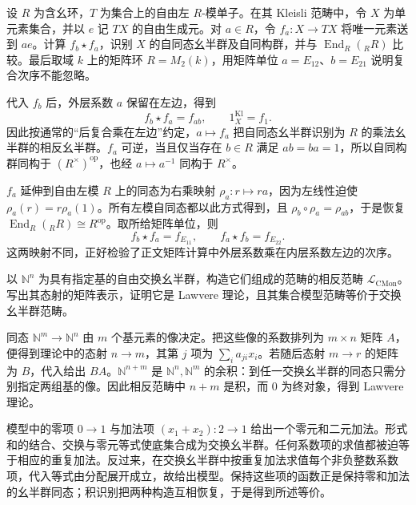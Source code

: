 \begin{exercise}\label{b4:ex:A-kleisli-module-matrices}
	设 \(R\) 为含幺环，\(T\) 为集合上的自由左 \(R\)-模单子。在其 Kleisli 范畴中，令 \(X\) 为单元素集合，并以 \(e\) 记 \(TX\) 的自由生成元。对 \(a\in R\)，令 \(f_a:X\to TX\) 将唯一元素送到 \(ae\)。计算 \(f_b\star f_a\)，识别 \(X\) 的自同态幺半群及自同构群，并与 \(\operatorname{End}_R({}_RR)\) 比较。最后取域 \(k\) 上的矩阵环 \(R=M_2(k)\)，用矩阵单位 \(a=E_{12}\)、\(b=E_{21}\) 说明复合次序不能忽略。
\end{exercise}
\begin{solution}
	代入 \(f_b\) 后，外层系数 \(a\) 保留在左边，得到
	\[
		f_b\star f_a=f_{ab},\qquad 1_X^{\mathrm{Kl}}=f_1.
	\]
	因此按通常的“后复合乘在左边”约定，\(a\mapsto f_a\) 把自同态幺半群识别为 \(R\) 的乘法幺半群的相反幺半群。\(f_a\) 可逆，当且仅当存在 \(b\in R\) 满足 \(ab=ba=1\)，所以自同构群同构于 \((R^\times)^{\mathrm{op}}\)，也经 \(a\mapsto a^{-1}\) 同构于 \(R^\times\)。

	\(f_a\) 延伸到自由左模 \(R\) 上的同态为右乘映射 \(\rho_a:r\mapsto ra\)，因为左线性迫使 \(\rho_a(r)=r\rho_a(1)\)。所有左模自同态都以此方式得到，且 \(\rho_b\circ\rho_a=\rho_{ab}\)，于是恢复 \(\operatorname{End}_R({}_RR)\cong R^{\mathrm{op}}\)。取所给矩阵单位，则
	\[
		f_b\star f_a=f_{E_{11}},\qquad f_a\star f_b=f_{E_{22}}.
	\]
	这两映射不同，正好检验了正文矩阵计算中外层系数乘在内层系数左边的次序。
\end{solution}

\begin{exercise}\label{b4:ex:A-lawvere-commutative-monoids}
	以 \(\mathbb N^n\) 为具有指定基的自由交换幺半群，构造它们组成的范畴的相反范畴 \(\mathcal L_{\mathrm{CMon}}\)。写出其态射的矩阵表示，证明它是 Lawvere 理论，且其集合模型范畴等价于交换幺半群范畴。
\end{exercise}
\begin{solution}
	同态 \(\mathbb N^m\to\mathbb N^n\) 由 \(m\) 个基元素的像决定。把这些像的系数排列为 \(m\times n\) 矩阵 \(A\)，便得到理论中的态射 \(n\to m\)，其第 \(j\) 项为 \(\sum_i a_{ji}x_i\)。若随后态射 \(m\to r\) 的矩阵为 \(B\)，代入给出 \(BA\)。\(\mathbb N^{n+m}\) 是 \(\mathbb N^n,\mathbb N^m\) 的余积：到任一交换幺半群的同态只需分别指定两组基的像。因此相反范畴中 \(n+m\) 是积，而 \(0\) 为终对象，得到 Lawvere 理论。

	模型中的零项 \(0\to1\) 与加法项 \((x_1+x_2):2\to1\) 给出一个零元和二元加法。形式和的结合、交换与零元等式使底集合成为交换幺半群。任何系数项的求值都被迫等于相应的重复加法。反过来，在交换幺半群中按重复加法求值每个非负整数系数项，代入等式由分配展开成立，故给出模型。保持这些项的函数正是保持零和加法的幺半群同态；积识别把两种构造互相恢复，于是得到所述等价。
\end{solution}

